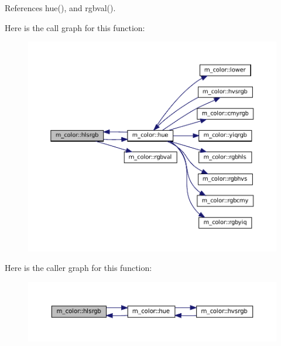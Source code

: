References hue(), and rgbval().

Here is the call graph for this function\+:
\nopagebreak
\begin{figure}[H]
\begin{center}
\leavevmode
\includegraphics[width=350pt]{namespacem__color_a40e6c91da216384eded2157cdaf86eba_cgraph}
\end{center}
\end{figure}
Here is the caller graph for this function\+:
\nopagebreak
\begin{figure}[H]
\begin{center}
\leavevmode
\includegraphics[width=350pt]{namespacem__color_a40e6c91da216384eded2157cdaf86eba_icgraph}
\end{center}
\end{figure}
\mbox{\label{namespacem__color_a56dd07bbf1378ccc78a230d171f9d429}} 
